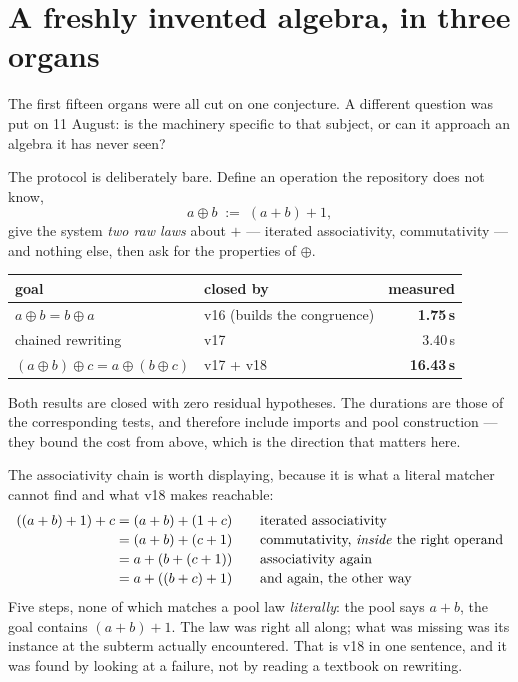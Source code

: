 \documentclass[11pt]{article}
\theoremstyle{remark}\newtheorem{remark}{Remark}
\begin{document}
\section{A freshly invented algebra, in three organs}
\label{sec:algebra}

The first fifteen organs were all cut on one conjecture. A different question was put on
11 August: is the machinery specific to that subject, or can it approach an algebra it
has never seen?

The protocol is deliberately bare. Define an operation the repository does not know,
\[ a \oplus b \;:=\; (a + b) + 1 , \]
give the system \emph{two raw laws} about $+$ --- iterated associativity, commutativity
--- and nothing else, then ask for the properties of $\oplus$.

\begin{center}\small
\begin{tabular}{@{}llr@{}}
\toprule
goal & closed by & measured \\
\midrule
$a \oplus b = b \oplus a$ & v16 (builds the congruence) & \textbf{1.75\,s} \\
chained rewriting & v17 & 3.40\,s \\
$(a \oplus b) \oplus c = a \oplus (b \oplus c)$ & v17 + v18 & \textbf{16.43\,s} \\
\bottomrule
\end{tabular}
\end{center}

Both results are closed with zero residual hypotheses. The durations are those of the
corresponding tests, and therefore include imports and pool construction --- they bound
the cost from above, which is the direction that matters here.

The associativity chain is worth displaying, because it is what a literal matcher cannot
find and what v18 makes reachable:
\[
\begin{array}{r@{\;}c@{\;}l@{\qquad}l}
((a+b)+1)+c &=& (a+b)+(1+c) & \text{iterated associativity} \\[2pt]
            &=& (a+b)+(c+1) & \text{commutativity, \emph{inside} the right operand} \\[2pt]
            &=& a+(b+(c+1)) & \text{associativity again} \\[2pt]
            &=& a+((b+c)+1) & \text{and again, the other way}
\end{array}
\]
Five steps, none of which matches a pool law \emph{literally}: the pool says $a+b$, the
goal contains $(a+b)+1$. The law was right all along; what was missing was its instance
at the subterm actually encountered. That is v18 in one sentence, and it was found by
looking at a failure, not by reading a textbook on rewriting.
\end{document}
